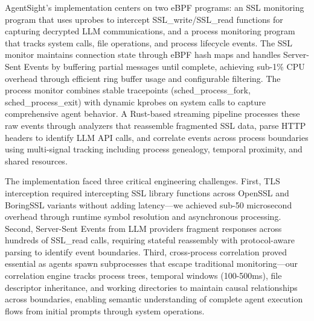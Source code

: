 AgentSight's implementation centers on two eBPF programs: an SSL monitoring program that uses uprobes to intercept SSL\_write/SSL\_read functions for capturing decrypted LLM communications, and a process monitoring program that tracks system calls, file operations, and process lifecycle events. The SSL monitor maintains connection state through eBPF hash maps and handles Server-Sent Events by buffering partial messages until complete, achieving sub-1\% CPU overhead through efficient ring buffer usage and configurable filtering. The process monitor combines stable tracepoints (sched\_process\_fork, sched\_process\_exit) with dynamic kprobes on system calls to capture comprehensive agent behavior. A Rust-based streaming pipeline processes these raw events through analyzers that reassemble fragmented SSL data, parse HTTP headers to identify LLM API calls, and correlate events across process boundaries using multi-signal tracking including process genealogy, temporal proximity, and shared resources.

The implementation faced three critical engineering challenges. First, TLS interception required intercepting SSL library functions across OpenSSL and BoringSSL variants without adding latency—we achieved sub-50 microsecond overhead through runtime symbol resolution and asynchronous processing. Second, Server-Sent Events from LLM providers fragment responses across hundreds of SSL\_read calls, requiring stateful reassembly with protocol-aware parsing to identify event boundaries. Third, cross-process correlation proved essential as agents spawn subprocesses that escape traditional monitoring—our correlation engine tracks process trees, temporal windows (100-500ms), file descriptor inheritance, and working directories to maintain causal relationships across boundaries, enabling semantic understanding of complete agent execution flows from initial prompts through system operations.